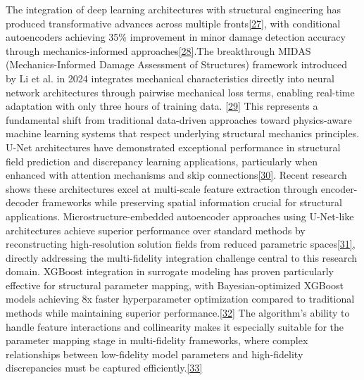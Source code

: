 \documentclass[12pt,a4paper]{report}
\begin{document}
The integration of deep learning architectures with structural engineering has produced transformative advances across multiple fronts\href{https://doi.org/10.3390/s20102778}{[27]}, with conditional autoencoders achieving 35\% improvement in minor damage detection accuracy through mechanics-informed approaches\href{https://arxiv.org/html/2402.15492v1}{[28]}.The breakthrough MIDAS (Mechanics-Informed Damage Assessment of Structures) framework introduced by Li et al. in 2024 integrates mechanical characteristics directly into neural network architectures through pairwise mechanical loss terms, enabling real-time adaptation with only three hours of training data. \href{https://doi.org/10.1038/s41467-024-52501-4}{[29]} This represents a fundamental shift from traditional data-driven approaches toward physics-aware machine learning systems that respect underlying structural mechanics principles. 
U-Net architectures have demonstrated exceptional performance in structural field prediction and discrepancy learning applications, particularly when enhanced with attention mechanisms and skip connections\href{https://www.sciencedirect.com/science/article/pii/S0955598622001753}{[30]}. Recent research shows these architectures excel at multi-scale feature extraction through encoder-decoder frameworks while preserving spatial information crucial for structural applications. Microstructure-embedded autoencoder approaches using U-Net-like architectures achieve superior performance over standard methods by reconstructing high-resolution solution fields from reduced parametric spaces\href{https://doi.org/10.1007/s00466-024-02568-z}{[31]}, directly addressing the multi-fidelity integration challenge central to this research domain. 
XGBoost integration in surrogate modeling has proven particularly effective for structural parameter mapping, with Bayesian-optimized XGBoost models achieving 8x faster hyperparameter optimization compared to traditional methods while maintaining superior performance.\href{https://doi.org/10.1016/j.engstruct.2023.117307}{[32]} The algorithm's ability to handle feature interactions and collinearity makes it especially suitable for the parameter mapping stage in multi-fidelity frameworks, where complex relationships between low-fidelity model parameters and high-fidelity discrepancies must be captured efficiently.\href{https://www.researchgate.net/figure/The-performance-of-XGBoost-surrogate-models-in-the-training-and-testing-for-predicting_fig5_372412960}{[33]}
\end{document}
